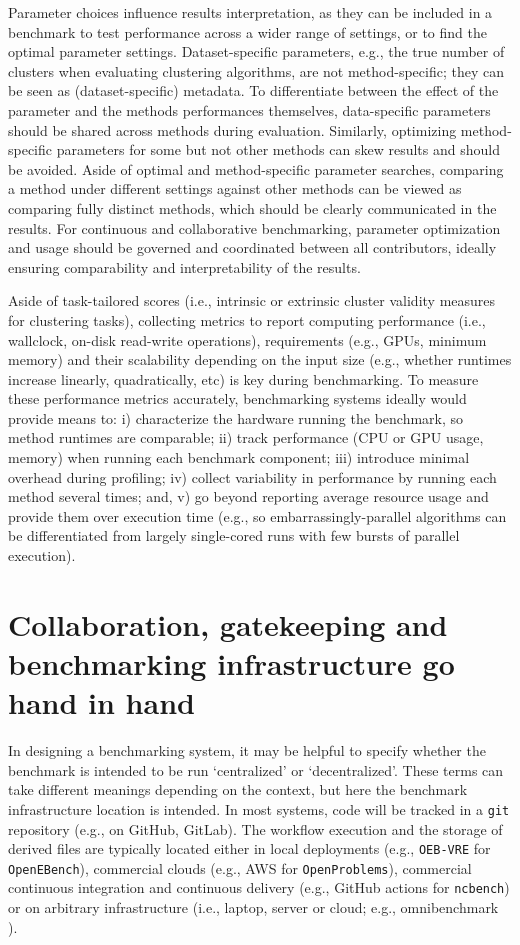 \documentclass[11pt]{article}
\begin{document}
Parameter choices influence results interpretation, as they can be included in a benchmark to test performance across a wider range of settings, or to find the optimal parameter settings. 
Dataset-specific parameters, e.g., the true number of clusters when evaluating clustering algorithms, are not method-specific; they can be seen as (dataset-specific) metadata. To differentiate between the effect of the parameter and the methods performances themselves, data-specific parameters should be shared across methods during evaluation.
Similarly, optimizing method-specific parameters for some but not other methods can skew results and should be avoided. 
Aside of optimal and method-specific parameter searches, comparing a method under different settings against other methods can be viewed as comparing fully distinct methods, which should be clearly communicated in the results. 
For continuous and collaborative benchmarking, parameter optimization and usage should be governed and coordinated between all contributors, ideally ensuring comparability and interpretability of the results. 

Aside of task-tailored scores (i.e., intrinsic or extrinsic cluster validity measures for clustering tasks), collecting metrics to report computing performance (i.e., wallclock, on-disk read-write operations), requirements (e.g., GPUs, minimum memory) and their scalability depending on the input size (e.g., whether runtimes increase linearly, quadratically, etc) is key during benchmarking. To measure these performance metrics accurately, benchmarking systems ideally would provide means to: i) characterize the hardware running the benchmark, so method runtimes are comparable;  ii) track performance (CPU or GPU usage, memory) when running each benchmark component; iii) introduce minimal overhead during profiling; iv) collect variability in performance by running each method several times; and, v) go beyond reporting average resource usage and provide them over execution time (e.g., so embarrassingly-parallel algorithms can be differentiated from largely single-cored runs with few bursts of parallel execution).

\section*{Collaboration, gatekeeping and benchmarking infrastructure go hand in hand}

In designing a benchmarking system, it may be helpful to specify whether the benchmark is intended to be run `centralized' or `decentralized'. These terms can take different meanings depending on the context, but here the benchmark infrastructure location is intended. In most systems, code will be tracked in a \texttt{git} repository (e.g., on GitHub, GitLab). The workflow execution and the storage of derived files are typically located either in local deployments (e.g., \texttt{OEB-VRE} for \texttt{OpenEBench}), commercial clouds (e.g., AWS for \texttt{OpenProblems}), commercial continuous integration and continuous delivery (e.g., GitHub actions for \texttt{ncbench}) or on arbitrary infrastructure (i.e., laptop, server or cloud; e.g., omnibenchmark \cite{omnibenchmark}). 
\end{document}
